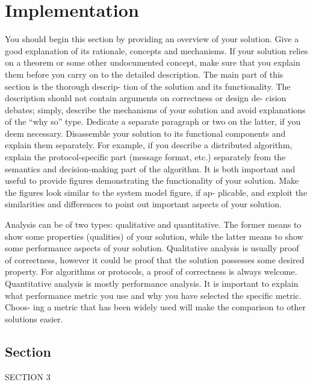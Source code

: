 
\chapter{Implementation}
\label{chap:implementation}

You should begin this section by providing an overview of
your solution. Give a good explanation of its rationale,
concepts and mechanisms. If your solution relies on a
theorem or some other undocumented concept, make sure
that you explain them before you carry on to the detailed
description.
The main part of this section is the thorough descrip-
tion of the solution and its functionality. The description
should not contain arguments on correctness or design de-
cision debates; simply, describe the mechanisms of your
solution and avoid explanations of the “why so” type.
Dedicate a separate paragraph or two on the latter, if
you deem necessary.
Disassemble your solution to its functional components
and explain them separately. For example, if you describe
a distributed algorithm, explain the protocol-specific part
(message format, etc.) separately from the semantics and
decision-making part of the algorithm.
It is both important and useful to provide figures
demonstrating the functionality of your solution. Make
the figures look similar to the system model figure, if ap-
plicable, and exploit the similarities and differences to
point out important aspects of your solution.

Analysis can be of two types: qualitative and quantitative.
The former means to show some properties (qualities)
of your solution, while the latter means to show some
performance aspects of your solution.
Qualitative analysis is usually proof of correctness,
however it could be proof that the solution possesses some
desired property. For algorithms or protocols, a proof of
correctness is always welcome.
Quantitative analysis is mostly performance analysis.
It is important to explain what performance metric you
use and why you have selected the specific metric. Choos-
ing a metric that has been widely used will make the
comparison to other solutions easier.

\section{Section}

SECTION 3
